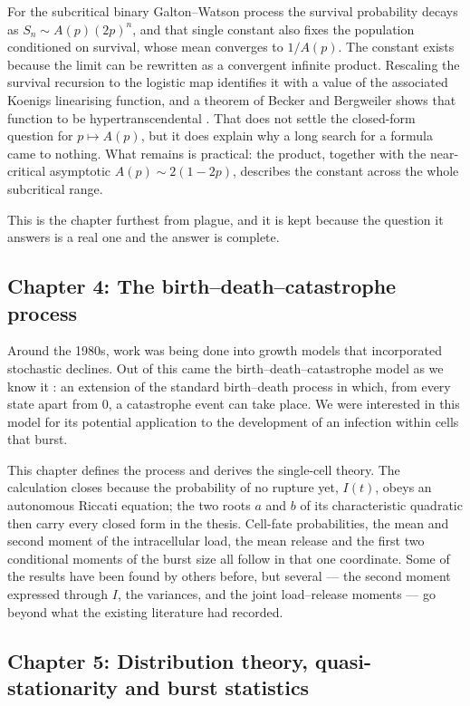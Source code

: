 For the subcritical binary Galton--Watson process the survival probability
decays as $S_n\sim A(p)(2p)^n$, and that single constant also fixes the
population conditioned on survival, whose mean converges to $1/A(p)$. The
constant exists because the limit can be rewritten as a convergent infinite
product. Rescaling the survival recursion to the logistic map identifies it
with a value of the associated Koenigs linearising function, and a theorem of
Becker and Bergweiler shows that function to be hypertranscendental
\cite{BeckerBergweiler1995}. That does not settle the closed-form question for
$p\mapsto A(p)$, but it does explain why a long search for a formula came to
nothing. What remains is practical: the product, together with the
near-critical asymptotic $A(p)\sim2(1-2p)$, describes the constant across the
whole subcritical range.

This is the chapter furthest from plague, and it is kept because the question
it answers is a real one and the answer is complete.

\subsection*{Chapter 4: The birth--death--catastrophe process}

Around the 1980s, work was being done into growth models that incorporated
stochastic declines. Out of this came the birth--death--catastrophe model as we
know it
\cite{brockwell1982birth,brockwell1985extinction,cairns2004extinction,dori2018family}:
an extension of the standard birth--death process in which, from every state
apart from $0$, a catastrophe event can take place. We were interested in this
model for its potential application to the development of an infection within
cells that burst.

This chapter defines the process and derives the single-cell theory. The
calculation closes because the probability of no rupture yet, $I(t)$, obeys an
autonomous Riccati equation; the two roots $a$ and $b$ of its characteristic
quadratic then carry every closed form in the thesis. Cell-fate probabilities,
the mean and second moment of the intracellular load, the mean release and the
first two conditional moments of the burst size all follow in that one
coordinate. Some of the results have been found by others before, but several
--- the second moment expressed through $I$, the variances, and the joint
load--release moments --- go beyond what the existing literature had recorded.

\subsection*{Chapter 5: Distribution theory, quasi-stationarity and burst
statistics}

